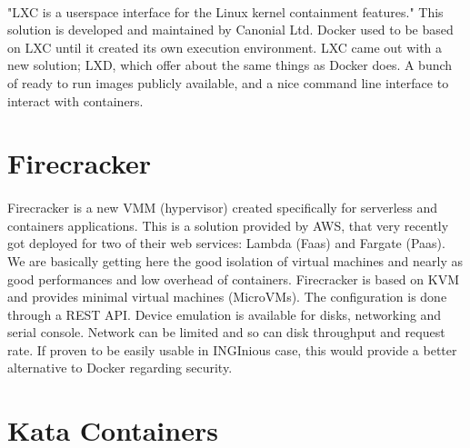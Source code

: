 \paragraph{}"LXC is a userspace interface for the Linux kernel containment features."\cite{lxc}  This solution is developed and maintained by Canonial Ltd.  Docker used to be based on LXC until it created its own execution environment.  LXC came out with a new solution; LXD, which offer about the same things as Docker does.  A bunch of ready to run images publicly available, and a nice command line interface to interact with containers.  %

\section{Firecracker} 
\paragraph{} Firecracker is a new VMM (hypervisor) created specifically for serverless and containers applications.  \cite{agachefirecracker}  This is a solution provided by AWS, that very recently got deployed for two of their web services: Lambda (Faas) and Fargate (Paas).  We are basically getting here the good isolation of virtual machines and nearly as good performances and low overhead of containers.  Firecracker is based on KVM and provides minimal virtual machines (MicroVMs).  The configuration is done through a REST API.  Device emulation is available for disks, networking and serial console.  Network can be limited and so can disk throughput and request rate.  If proven to be easily usable in INGInious case, this would provide a better alternative to Docker regarding security.

\section{Kata Containers}
